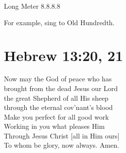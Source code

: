 \documentclass{article}
\begin{document}
\noindent Long Meter 8.8.8.8

\noindent For example, sing to Old Hundredth.

\section*{Hebrew 13:20, 21}

 Now may the God of peace who has\\
brought from the dead Jesus our Lord\\
the great Shepherd of all His sheep\\
through the eternal cov'nant's blood\\

 Make you perfect for all good work\\
Working in you what pleases Him\\
Through Jesus Christ [all in Him ours]\\
To whom be glory, now always. Amen.
\end{document}
